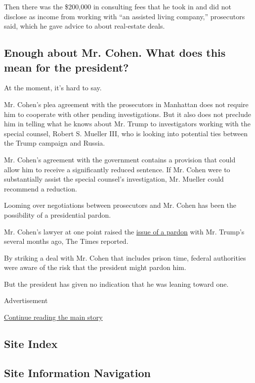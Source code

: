 Then there was the \$200,000 in consulting fees that he took in and did
not disclose as income from working with ``an assisted living company,''
prosecutors said, which he gave advice to about real-estate deals.

\hypertarget{enough-about-mr-cohen-what-does-this-mean-for-the-president}{%
\subsection{Enough about Mr. Cohen. What does this mean for the
president?}\label{enough-about-mr-cohen-what-does-this-mean-for-the-president}}

At the moment, it's hard to say.

Mr. Cohen's plea agreement with the prosecutors in Manhattan does not
require him to cooperate with other pending investigations. But it also
does not preclude him in telling what he knows about Mr. Trump to
investigators working with the special counsel, Robert S. Mueller III,
who is looking into potential ties between the Trump campaign and
Russia.

Mr. Cohen's agreement with the government contains a provision that
could allow him to receive a significantly reduced sentence. If Mr.
Cohen were to substantially assist the special counsel's investigation,
Mr. Mueller could recommend a reduction.

Looming over negotiations between prosecutors and Mr. Cohen has been the
possibility of a presidential pardon.

Mr. Cohen's lawyer at one point raised the
\href{https://www.nytimes3xbfgragh.onion/2018/05/31/us/politics/pardons-trump.html}{issue
of a pardon} with Mr. Trump's several months ago, The Times reported.

By striking a deal with Mr. Cohen that includes prison time, federal
authorities were aware of the risk that the president might pardon him.

But the president has given no indication that he was leaning toward
one.

Advertisement

\protect\hyperlink{after-bottom}{Continue reading the main story}

\hypertarget{site-index}{%
\subsection{Site Index}\label{site-index}}

\hypertarget{site-information-navigation}{%
\subsection{Site Information
Navigation}\label{site-information-navigation}}

